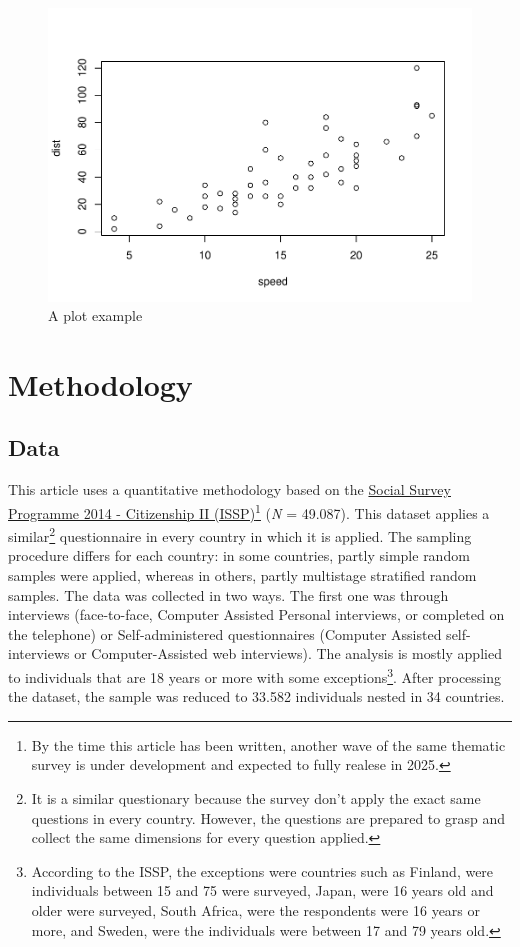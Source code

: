 \documentclass[12pt]{article}
\begin{document}
\begin{figure}
\centering
\includegraphics{class-structure-and-collective-action_files/figure-latex/unnamed-chunk-1-1.pdf}
\caption{A plot example}
\end{figure}

\hypertarget{methodology}{%
\section{Methodology}\label{methodology}}

\hypertarget{data}{%
\subsection{Data}\label{data}}

This article uses a quantitative methodology based on the
\href{https://www.gesis.org/en/issp/modules/issp-modules-by-topic/citizenship/2014}{Social
Survey Programme 2014 - Citizenship II (ISSP)}\footnote{By the time this
  article has been written, another wave of the same thematic survey is
  under development and expected to fully realese in 2025.} (\emph{N} =
49.087). This dataset applies a similar\footnote{It is a similar
  questionary because the survey don't apply the exact same questions in
  every country. However, the questions are prepared to grasp and
  collect the same dimensions for every question applied.} questionnaire
in every country in which it is applied. The sampling procedure differs
for each country: in some countries, partly simple random samples were
applied, whereas in others, partly multistage stratified random samples.
The data was collected in two ways. The first one was through interviews
(face-to-face, Computer Assisted Personal interviews, or completed on
the telephone) or Self-administered questionnaires (Computer Assisted
self-interviews or Computer-Assisted web interviews). The analysis is
mostly applied to individuals that are 18 years or more with some
exceptions\footnote{According to the ISSP, the exceptions were countries
  such as Finland, were individuals between 15 and 75 were surveyed,
  Japan, were 16 years old and older were surveyed, South Africa, were
  the respondents were 16 years or more, and Sweden, were the
  individuals were between 17 and 79 years old.}. After processing the
dataset, the sample was reduced to 33.582 individuals nested in 34
countries.
\end{document}
